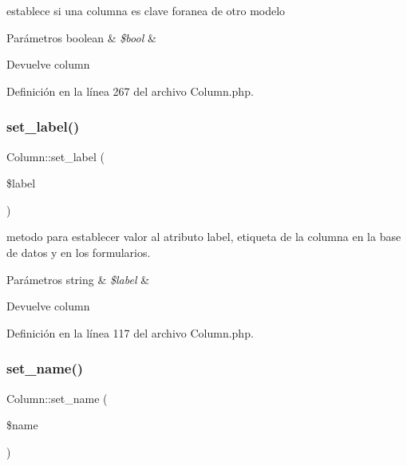 establece si una columna es clave foranea de otro modelo


\begin{DoxyParams}[1]{Parámetros}
boolean & {\em \$bool} & \\
\hline
\end{DoxyParams}
\begin{DoxyReturn}{Devuelve}
column 
\end{DoxyReturn}


Definición en la línea 267 del archivo Column.\+php.

\mbox{\label{class_column_ac17cbac2309c3ab456b818d7be33b2e7}} 
\subsubsection{\texorpdfstring{set\_label()}{set\_label()}}
{\footnotesize\ttfamily Column\+::set\+\_\+label (\begin{DoxyParamCaption}\item[{}]{\$label }\end{DoxyParamCaption})}

metodo para establecer valor al atributo label, etiqueta de la columna en la base de datos y en los formularios.


\begin{DoxyParams}[1]{Parámetros}
string & {\em \$label} & \\
\hline
\end{DoxyParams}
\begin{DoxyReturn}{Devuelve}
column 
\end{DoxyReturn}


Definición en la línea 117 del archivo Column.\+php.

\mbox{\label{class_column_adb76436490cc4941cfd8ded9336f3321}} 
\subsubsection{\texorpdfstring{set\_name()}{set\_name()}}
{\footnotesize\ttfamily Column\+::set\+\_\+name (\begin{DoxyParamCaption}\item[{}]{\$name }\end{DoxyParamCaption})}

